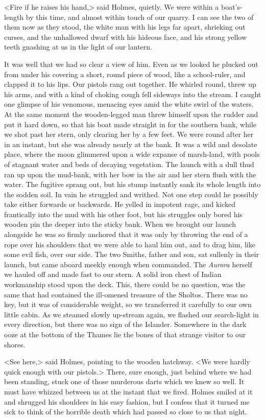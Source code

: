 <Fire if he raises his hand,> said Holmes, quietly. We were within a boat's-length by this time, and almost within touch of our quarry. I can see the two of them now as they stood, the white man with his legs far apart, shrieking out curses, and the unhallowed dwarf with his hideous face, and his strong yellow teeth gnashing at us in the light of our lantern.

It was well that we had so clear a view of him. Even as we looked he plucked out from under his covering a short, round piece of wood, like a school-ruler, and clapped it to his lips. Our pistols rang out together. He whirled round, threw up his arms, and with a kind of choking cough fell sideways into the stream. I caught one glimpse of his venomous, menacing eyes amid the white swirl of the waters. At the same moment the wooden-legged man threw himself upon the rudder and put it hard down, so that his boat made straight in for the southern bank, while we shot past her stern, only clearing her by a few feet. We were round after her in an instant, but she was already nearly at the bank. It was a wild and desolate place, where the moon glimmered upon a wide expanse of marsh-land, with pools of stagnant water and beds of decaying vegetation. The launch with a dull thud ran up upon the mud-bank, with her bow in the air and her stern flush with the water. The fugitive sprang out, but his stump instantly sank its whole length into the sodden soil. In vain he struggled and writhed. Not one step could he possibly take either forwards or backwards. He yelled in impotent rage, and kicked frantically into the mud with his other foot, but his struggles only bored his wooden pin the deeper into the sticky bank. When we brought our launch alongside he was so firmly anchored that it was only by throwing the end of a rope over his shoulders that we were able to haul him out, and to drag him, like some evil fish, over our side. The two Smiths, father and son, sat sullenly in their launch, but came aboard meekly enough when commanded. The \textit{Aurora} herself we hauled off and made fast to our stern. A solid iron chest of Indian workmanship stood upon the deck. This, there could be no question, was the same that had contained the ill-omened treasure of the Sholtos. There was no key, but it was of considerable weight, so we transferred it carefully to our own little cabin. As we steamed slowly up-stream again, we flashed our search-light in every direction, but there was no sign of the Islander. Somewhere in the dark ooze at the bottom of the Thames lie the bones of that strange visitor to our shores.

<See here,> said Holmes, pointing to the wooden hatchway. <We were hardly quick enough with our pistols.> There, sure enough, just behind where we had been standing, stuck one of those murderous darts which we knew so well. It must have whizzed between us at the instant that we fired. Holmes smiled at it and shrugged his shoulders in his easy fashion, but I confess that it turned me sick to think of the horrible death which had passed so close to us that night.
